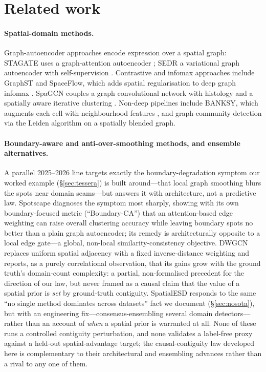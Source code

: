 \documentclass[journal]{IEEEtran}
\begin{document}
\section{Related work}
\paragraph{Spatial-domain methods.} Graph-autoencoder approaches encode expression over a spatial graph:
STAGATE uses a graph-attention autoencoder \citep{dong2022stagate}; SEDR a variational graph autoencoder
with self-supervision \citep{xu2024sedr}. Contrastive and infomax approaches include GraphST
\citep{long2023graphst} and SpaceFlow, which adds spatial regularisation to deep graph infomax
\citep{ren2022spaceflow}. SpaGCN couples a graph convolutional network with histology and a spatially
aware iterative clustering \citep{hu2021spagcn}. Non-deep pipelines include BANKSY, which augments each
cell with neighbourhood features \citep{singhal2024banksy}, and graph-community detection via the Leiden
algorithm \citep{traag2019leiden} on a spatially blended graph.

\paragraph{Boundary-aware and anti-over-smoothing methods, and ensemble alternatives.} A parallel
2025--2026 line targets exactly the boundary-degradation symptom our worked example (\S\ref{sec:tessera})
is built around---that local graph smoothing blurs the spots near domain seams---but answers it with
architecture, not a predictive law. Spotscape \citep{oh2025spotscape} diagnoses the symptom most sharply,
showing with its own boundary-focused metric (``Boundary-CA'') that an attention-based edge weighting can
raise overall clustering accuracy while leaving boundary spots no better than a plain graph autoencoder;
its remedy is architecturally opposite to a local edge gate---a global, non-local similarity-consistency
objective. DWGCN \citep{peng2026dwgcn} replaces uniform spatial adjacency with a fixed inverse-distance
weighting and reports, as a purely correlational observation, that its gains grow with the ground truth's
domain-count complexity: a partial, non-formalised precedent for the direction of our law, but never
framed as a causal claim that the value of a spatial prior is \emph{set} by ground-truth contiguity.
SpatialESD \citep{cao2025spatialesd} responds to the same ``no single method dominates across datasets''
fact we document (\S\ref{sec:nosota}), but with an engineering fix---consensus-ensembling several domain
detectors---rather than an account of \emph{when} a spatial prior is warranted at all. None of these runs
a controlled contiguity perturbation, and none validates a label-free proxy against a held-out
spatial-advantage target; the causal-contiguity law developed here is complementary to their
architectural and ensembling advances rather than a rival to any one of them.
\end{document}
